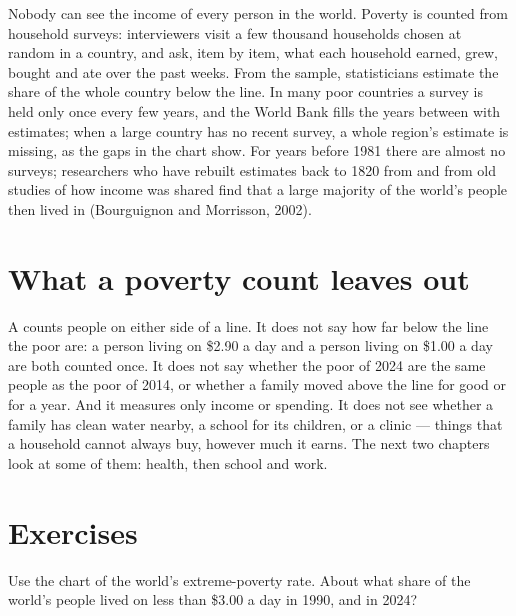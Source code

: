 \begin{measure}
Nobody can see the income of every person in the world. Poverty is counted from
household surveys: interviewers visit a few thousand households chosen at
random in a country, and ask, item by item, what each household earned, grew,
bought and ate over the past weeks. From the sample, statisticians estimate
the share of the whole country below the line. In many poor countries a survey
is held only once every few years, and the World Bank fills the years between
with estimates; when a large country has no recent survey, a whole region's
estimate is missing, as the gaps in the chart show. For years before 1981 there
are almost no surveys; researchers who have rebuilt estimates back to 1820 from
 and from old studies of how income was shared find that a
large majority of the world's people then lived in  (Bourguignon
and Morrisson, 2002).
\end{measure}

\section{What a poverty count leaves out}

A  counts people on either side of a line. It does not say how far
below the line the poor are: a person living on \$2.90 a day and a person living
on \$1.00 a day are both counted once. It does not say whether the poor of
2024 are the same people as the poor of 2014, or whether a family moved above the
line for good or for a year. And it measures only income or spending. It does
not see whether a family has clean water nearby, a school for its children, or
a clinic --- things that a household cannot always buy, however much it earns.
The next two chapters look at some of them: health, then school and work.

\section{Exercises}

\begin{exercise}[$\star$]\label{exo:g6:poverty:1}
Use the chart of the world's extreme-poverty rate. About what share of the
world's people lived on less than \$3.00 a day in 1990, and in 2024?
\end{exercise}


